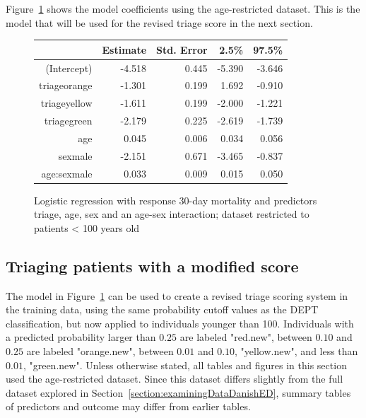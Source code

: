 Figure~\ref{figure:triageAgeSexMort30AgeRestrLogreg} shows the model coefficients using the age-restricted dataset.  This is the model that will be used for the revised triage score in the next section.

\begin{figure}[htp]
\centering
\begin{tabular}{rrrrr}
  \hline
  & Estimate & Std. Error & 2.5\% & 97.5\%  \\ 
  \hline
  (Intercept) & -4.518 & 0.445 & -5.390 & -3.646 \\ 
  triageorange & -1.301 & 0.199 & 1.692 & -0.910  \\ 
  triageyellow & -1.611 & 0.199 & -2.000 & -1.221  \\ 
  triagegreen & -2.179 & 0.225 & -2.619 & -1.739  \\ 
  age & 0.045 & 0.006 & 0.034  & 0.056 \\ 
  sexmale & -2.151 & 0.671 & -3.465 & -0.837 \\ 
  age:sexmale & 0.033 & 0.009 &  0.015 & 0.050  \\ 
   \hline
\end{tabular}
\caption{Logistic regression with response 30-day mortality and 
       predictors triage, age, sex and an age-sex interaction; dataset restricted to patients < 100 years old} 
\label{figure:triageAgeSexMort30AgeRestrLogreg}
\end{figure}

\subsection{Triaging patients with a modified score}
\label{section:triageWithModifiedScore}

The model in Figure~\ref{figure:triageAgeSexMort30AgeRestrLogreg} can be used to create a revised triage scoring system in the training data, using the same probability cutoff values as the DEPT classification, but now applied to individuals younger than 100.  Individuals with a predicted probability larger than $0.25$ are labeled "red.new", between $0.10$ and $0.25$ are labeled "orange.new", between $0.01$ and $0.10$, "yellow.new", and less than $0.01$, "green.new".  Unless otherwise stated, all tables and figures in this section used the age-restricted dataset. Since this dataset differs slightly from the full dataset explored in Section~\ref{section:examiningDataDanishED}, summary tables of predictors and outcome may differ from earlier tables. 

